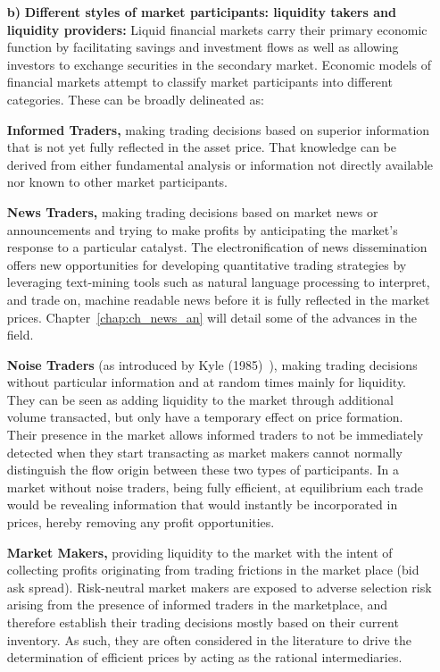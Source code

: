 \begin{enumerate}
\item[\textbf{b)}] \textbf{Different styles of market participants: liquidity takers and liquidity providers:} Liquid financial markets carry their primary economic function by facilitating savings and investment flows as well as allowing investors to exchange securities in the secondary market. Economic models of financial markets attempt to classify market participants into different categories. These can be broadly delineated as: \twomedskip

\textbf{Informed Traders,} making trading decisions based on superior information that is not yet fully reflected in the asset price. That knowledge can be derived from either fundamental analysis or information not directly available nor known to other market participants. \twomedskip

\textbf{News Traders,} making trading decisions based on market news or announcements and trying to make profits by anticipating the market's response to a particular catalyst. The electronification of news dissemination offers new opportunities for developing quantitative trading strategies by leveraging text-mining tools such as natural language processing to interpret, and trade on, machine readable news before it is fully reflected in the market prices. Chapter~\ref{chap:ch_news_an} will detail some of the advances in the field. \twomedskip

\textbf{Noise Traders} (as introduced by Kyle (1985)~\cite{kyle1985}), making trading decisions without particular information and at random times mainly for liquidity. They can be seen as adding liquidity to the market through additional volume transacted, but only have a temporary effect on price formation. Their presence in the market allows informed traders to not be immediately detected when they start transacting as market makers cannot normally distinguish the flow origin between these two types of participants. In a market without noise traders, being fully efficient, at equilibrium each trade would be revealing information that would instantly be incorporated in prices, hereby removing any profit opportunities. \twomedskip

\textbf{Market Makers,} providing liquidity to the market with the intent of collecting profits originating from trading frictions in the market place (bid ask spread). Risk-neutral market makers are exposed to adverse selection risk arising from the presence of informed traders in the marketplace, and therefore establish their trading decisions mostly based on their current inventory. As such, they are often considered in the literature to drive the determination of efficient prices by acting as the rational intermediaries.  


\end{enumerate}
